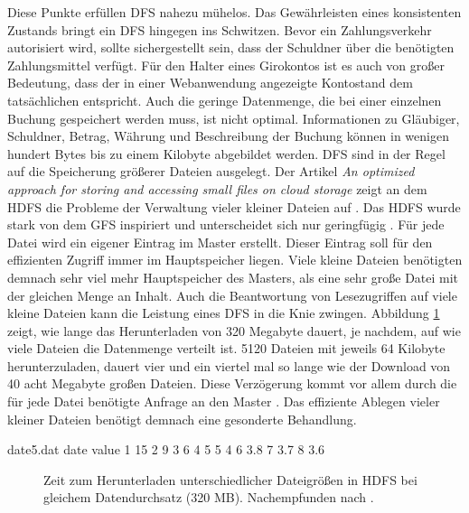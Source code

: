\documentclass[12pt,oneside,a4paper,parskip]{scrbook}
\begin{document}
Diese Punkte erfüllen DFS nahezu mühelos. Das Gewährleisten eines konsistenten Zustands bringt ein DFS hingegen ins Schwitzen. Bevor ein Zahlungsverkehr autorisiert wird, sollte sichergestellt sein, dass der Schuldner über die benötigten Zahlungsmittel verfügt. Für den Halter eines Girokontos ist es auch von großer Bedeutung, dass der in einer Webanwendung angezeigte Kontostand dem tatsächlichen entspricht. Auch die geringe Datenmenge, die bei einer einzelnen Buchung gespeichert werden muss, ist nicht optimal. Informationen zu Gläubiger, Schuldner, Betrag, Währung und Beschreibung der Buchung können in wenigen hundert Bytes bis zu einem Kilobyte abgebildet werden. DFS sind in der Regel auf die Speicherung größerer Dateien ausgelegt. Der Artikel \textit{An optimized approach for storing and accessing small files on cloud storage} zeigt an dem HDFS die Probleme der Verwaltung vieler kleiner Dateien auf \cite{hdfsSmallFiles}. Das HDFS wurde stark von dem GFS inspiriert und unterscheidet sich nur geringfügig \cite{hdfsGfs}. Für jede Datei wird ein eigener Eintrag im Master erstellt. Dieser Eintrag soll für den effizienten Zugriff immer im Hauptspeicher liegen. Viele kleine Dateien benötigten demnach sehr viel mehr Hauptspeicher des Masters, als eine sehr große Datei mit der gleichen Menge an Inhalt. Auch die Beantwortung von Lesezugriffen auf viele kleine Dateien kann die Leistung eines DFS in die Knie zwingen. Abbildung \ref{hdfsSmallFiles} zeigt, wie lange das Herunterladen von 320 Megabyte dauert, je nachdem, auf wie viele Dateien die Datenmenge verteilt ist. 5120 Dateien mit jeweils 64 Kilobyte herunterzuladen, dauert vier und ein viertel mal so lange wie der Download von 40 acht Megabyte großen Dateien. Diese Verzögerung kommt vor allem durch die für jede Datei benötigte Anfrage an den Master \cite{hdfsSmallFiles}. Das effiziente Ablegen vieler kleiner Dateien benötigt demnach eine gesonderte Behandlung.



\begin{filecontents}{date5.dat}
date  value
1   15
2   9
3   6
4   5
5   4
6   3.8
7   3.7
8   3.6
\end{filecontents}


\begin{figure}
\begin{center}
\caption[Zeit zum Herunterladen unterschiedlicher Dateigrößen in HDFS]{Zeit zum Herunterladen unterschiedlicher Dateigrößen in HDFS bei gleichem Datendurchsatz (320 MB). Nachempfunden nach \cite{hdfsSmallFiles}.}
\label{hdfsSmallFiles}
\end{center}
\end{figure}
\end{document}
